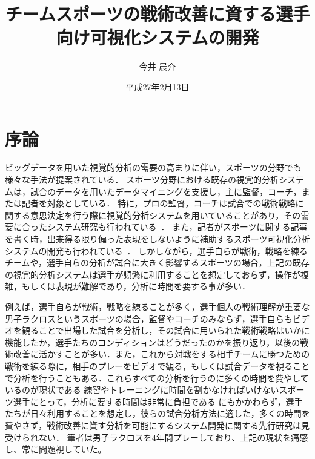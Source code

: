 \documentclass[sotsuron]{kuee}
\title{チームスポーツの戦術改善に資する選手向け可視化システムの開発}
\author{今井 晨介}
\date{平成27年2月13日}
\begin{document}
\maketitle
\tableofcontents


\chapter{序論}
	ビッグデータを用いた視覚的分析の需要の高まりに伴い，スポーツの分野でも様々な手法が提案されている．
	スポーツ分野における既存の視覚的分析システムは，試合のデータを用いたデータマイニングを支援し，主に監督，コーチ，または記者を対象としている．
	特に，プロの監督，コーチは試合での戦術戦略に関する意思決定を行う際に視覚的分析システムを用いていることがあり，その需要に合ったシステム研究も行われている~\cite{SoccerStory,SnapShot,TenniVis}．
	また，記者がスポーツに関する記事を書く時，出来得る限り偏った表現をしないように補助するスポーツ可視化分析システムの開発も行われている~\cite{SoccerStory}．
	しかしながら，選手自らが戦術，戦略を練るチームや，選手自らの分析が試合に大きく影響するスポーツの場合，上記の既存の視覚的分析システムは選手が頻繁に利用することを想定しておらず，操作が複雑，もしくは表現が難解であり，分析に時間を要する事が多い．
	
	例えば，選手自らが戦術，戦略を練ることが多く，選手個人の戦術理解が重要な男子ラクロスというスポーツの場合，監督やコーチのみならず，選手自らもビデオを観ることで出場した試合を分析し，その試合に用いられた戦術戦略はいかに機能したか，選手たちのコンディションはどうだったのかを振り返り，以後の戦術改善に活かすことが多い．また，これから対戦をする相手チームに勝つための戦術を練る際に，相手のプレーをビデオで観る，もしくは試合データを視ることで分析を行うこともある．これらすべての分析を行うのに多くの時間を費やしているのが現状である
	練習やトレーニングに時間を割かなければいけないスポーツ選手にとって，分析に要する時間は非常に負担である
	にもかかわらず，選手たちが日々利用することを想定し，彼らの試合分析方法に適した，多くの時間を費やさず，戦術改善に資す分析を可能にするシステム開発に関する先行研究は見受けられない．
	筆者は男子ラクロスを4年間プレーしており、上記の現状を痛感し、常に問題視していた。
	
\end{document}
